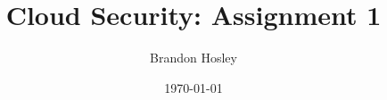\documentclass[]{article}
\title{Cloud Security: Assignment 1}
\author{Brandon Hosley}
\date{\today}
\begin{document}
\maketitle

\subsection*{}
\end{document}
